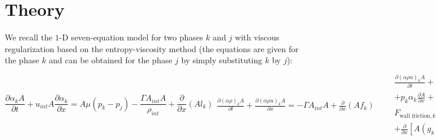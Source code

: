 \documentclass{anstrans}
\begin{document}
\section{Theory}
%
We recall the $1$-D seven-equation model for two phases $k$ and $j$ with viscous regularization  based on the entropy-viscosity 
method (the equations are given for the phase $k$ and can be obtained for the phase $j$ by simply substituting $k$ by $j$):
\begin{subequations}
\label{eq:euler_visc}
%
\begin{equation}\label{eq:vf_eq}
  \frac{\partial \alpha_{k} A}{\partial t} + u_{int} A \frac{\partial \alpha_{k}}{\partial x}
  = A \mu (p_{k} - p_{j}) - \frac{\Gamma A_{int} A}{\rho_{int}} + \boxed{\frac{\partial }{\partial x} \left( A l_k  \right)}
\end{equation}
%
\begin{eqnarray}
  \frac{\partial \left( \alpha \rho \right)_{k} A}{\partial t}
  + \frac{\partial \left( \alpha \rho u \right)_{k} A}{\partial x}
  = - \Gamma A_{int} A
   + \boxed{\frac{\partial }{\partial x} \left( A f_k \right)}
\end{eqnarray}
%
\begin{eqnarray}
 && \frac{\partial \left( \alpha \rho u \right)_{k} A}{\partial t}
  + \frac{\partial \alpha_{k} A \left( \rho u^2 + p \right)_{k} }{\partial x}   = p_{int} A \frac{\partial \alpha_{k}}{\partial x} \nonumber \\
 &&+ p_{k} \alpha_{k} \frac{\partial A}{\partial x}
  + A \lambda (u_{j} - u_{k}) - \Gamma A_{int} u_{int} A - \nonumber \\
  &&F_{\text{wall friction}, k} - F_{\text{friction}, j}
  + \left( \alpha \rho \right)_{k} A \vec{g} \cdot \vec{n}_{axis} \nonumber \\
 && + \boxed{\frac{\partial }{\partial x} \left[ A \left( g_k + u_k f_k \right) \right] }
\end{eqnarray}
%
\begin{eqnarray}
 &&\frac{\partial \left( \alpha \rho E \right)_{k} A}{\partial t}
  + \frac{\partial \alpha_{k} u_{k} A \left( \rho E + p \right)_{k}}{\partial x}
  = p_{int} u_{int} A \frac{\partial \alpha_{k}}{\partial x} 
  \nonumber \\
  &&- \bar{p}_{int} A \mu (p_{k} - p_{j})+ \bar{u}_{int} A \lambda (u_{j} - u_{k})
  \nonumber \\
  &&+ \Gamma A_{int} \left( \frac{p_{int}}{\rho_{int}} - H_{k, int} \right) A
  + Q_{int, k} + Q_{\text{wall}, k} \nonumber \\ 
 && + \boxed{\frac{\partial }{\partial x} \left[ A \left( h_k + u_k g_k - \frac{u_k^2}{2}f_k + \rho_k e_k l_k\right) \right] }
\end{eqnarray}
%
\end{subequations}
\end{document}
